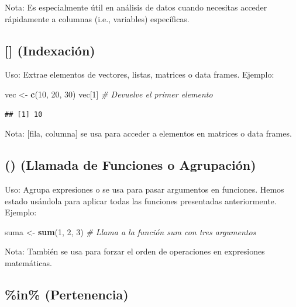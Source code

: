\documentclass[
]{book}
\newenvironment{Shaded}{\begin{snugshade}}{\end{snugshade}}
\newcommand{\CommentTok}[1]{\textcolor[rgb]{0.56,0.35,0.01}{\textit{#1}}}
\newcommand{\DecValTok}[1]{\textcolor[rgb]{0.00,0.00,0.81}{#1}}
\newcommand{\FunctionTok}[1]{\textcolor[rgb]{0.13,0.29,0.53}{\textbf{#1}}}
\newcommand{\NormalTok}[1]{#1}
\newcommand{\OtherTok}[1]{\textcolor[rgb]{0.56,0.35,0.01}{#1}}
\begin{document}
Nota: Es especialmente útil en análisis de datos cuando necesitas acceder rápidamente a columnas (i.e., variables) específicas.

\subsection{{[}{]} (Indexación)}\label{indexaciuxf3n}

Uso: Extrae elementos de vectores, listas, matrices o data frames.
Ejemplo:

\begin{Shaded}
\begin{Highlighting}[]
\NormalTok{vec }\OtherTok{\textless{}{-}} \FunctionTok{c}\NormalTok{(}\DecValTok{10}\NormalTok{, }\DecValTok{20}\NormalTok{, }\DecValTok{30}\NormalTok{)}
\NormalTok{vec[}\DecValTok{1}\NormalTok{]  }\CommentTok{\# Devuelve el primer elemento}
\end{Highlighting}
\end{Shaded}

\begin{verbatim}
## [1] 10
\end{verbatim}

Nota: {[}fila, columna{]} se usa para acceder a elementos en matrices o data frames.

\subsection{() (Llamada de Funciones o Agrupación)}\label{llamada}

Uso: Agrupa expresiones o se usa para pasar argumentos en funciones. Hemos estado usándola para aplicar todas las funciones presentadas anteriormente.
Ejemplo:

\begin{Shaded}
\begin{Highlighting}[]
\NormalTok{suma }\OtherTok{\textless{}{-}} \FunctionTok{sum}\NormalTok{(}\DecValTok{1}\NormalTok{, }\DecValTok{2}\NormalTok{, }\DecValTok{3}\NormalTok{)  }\CommentTok{\# Llama a la función sum con tres argumentos}
\end{Highlighting}
\end{Shaded}

Nota: También se usa para forzar el orden de operaciones en expresiones matemáticas.

\subsection{\%in\% (Pertenencia)}\label{pertenencia}
\end{document}
